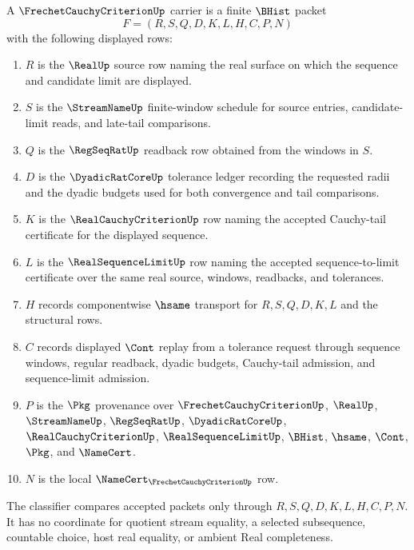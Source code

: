\begin{definition}
\label{def:frechet-cauchy-criterion-carrier}
A $\FrechetCauchyCriterionUp$ carrier is a finite $\BHist$ packet
$$
F=(R,S,Q,D,K,L,H,C,P,N)
$$
with the following displayed rows:
\begin{enumerate}
\item $R$ is the $\RealUp$ source row naming the real surface on which the sequence and candidate limit are displayed.
\item $S$ is the $\StreamNameUp$ finite-window schedule for source entries, candidate-limit reads, and late-tail comparisons.
\item $Q$ is the $\RegSeqRatUp$ readback row obtained from the windows in $S$.
\item $D$ is the $\DyadicRatCoreUp$ tolerance ledger recording the requested radii and the dyadic budgets used for both convergence and tail comparisons.
\item $K$ is the $\RealCauchyCriterionUp$ row naming the accepted Cauchy-tail certificate for the displayed sequence.
\item $L$ is the $\RealSequenceLimitUp$ row naming the accepted sequence-to-limit certificate over the same real source, windows, readbacks, and tolerances.
\item $H$ records componentwise $\hsame$ transport for $R,S,Q,D,K,L$ and the structural rows.
\item $C$ records displayed $\Cont$ replay from a tolerance request through sequence windows, regular readback, dyadic budgets, Cauchy-tail admission, and sequence-limit admission.
\item $P$ is the $\Pkg$ provenance over $\FrechetCauchyCriterionUp$, $\RealUp$, $\StreamNameUp$, $\RegSeqRatUp$, $\DyadicRatCoreUp$, $\RealCauchyCriterionUp$, $\RealSequenceLimitUp$, $\BHist$, $\hsame$, $\Cont$, $\Pkg$, and $\NameCert$.
\item $N$ is the local $\NameCert_{\FrechetCauchyCriterionUp}$ row.
\end{enumerate}
The classifier compares accepted packets only through $R,S,Q,D,K,L,H,C,P,N$. It has no coordinate for quotient stream equality, a selected subsequence, countable choice, host real equality, or ambient Real completeness.
\end{definition}


